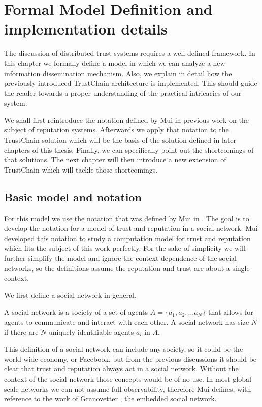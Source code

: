 \chapter{Formal Model Definition and implementation details}
The discussion of distributed trust systems requires a well-defined framework. In this chapter we
formally define a model in which we can analyze a new information dissemination mechanism. Also, we
explain in detail how the previously introduced TrustChain architecture is implemented. This should
guide the reader towards a proper understanding of the practical intricacies of our system. 

We shall first reintroduce the
notation defined by Mui in previous work on the subject of reputation systems. Afterwards we
apply that notation to the TrustChain solution which will be the basis of the solution defined
in later chapters of this thesis. Finally, we can specifically point out the shortcomings of that
solutions. The next chapter will then introduce a new extension of TrustChain which will tackle
those shortcomings.


\section{Basic model and notation}
\label{sec:notation}
For this model we use the notation that was defined by Mui in \cite{mui2002computational}. The goal 
is to develop the notation for a model of trust and reputation in a social network. Mui developed 
this notation to study a computation model for trust and reputation which fits the subject of this 
work perfectly. For the sake of simplicity we will further simplify the model and ignore the context
dependence of the social networks, so the definitions assume the reputation and trust are about a
single context.

We first define a social network in general.

\begin{defn}
    A social network is a society of a set of agents $A = \{a_1, a_2, \dots a_N\}$ that allows for agents to communicate and
    interact with each other. A social network has size $N$ if there are $N$ uniquely identifiable
    agents $a_i$ in $A$.
\end{defn}

This definition of a social network can include any society, so it could be the world wide economy,
or Facebook, but from the previous discussions it should be clear that trust and reputation always 
act in a social network. Without the context of the social network those concepts would be of no
use. In most global scale networks we can not assume full observability, therefore Mui defines, with
reference to the work of Granovetter \cite{granovetter1985economic}, the embedded social network.

